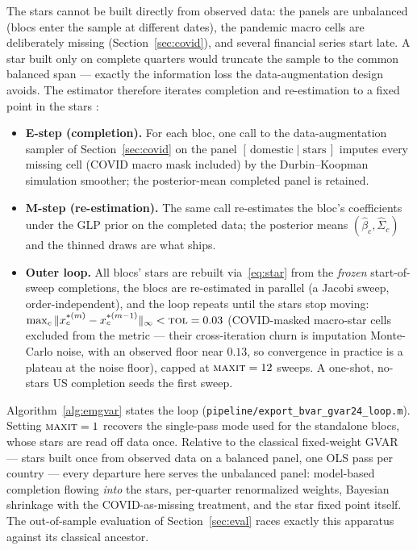 \documentclass[11pt]{article}
\theoremstyle{plain}
\theoremstyle{remark}
\begin{document}
The stars cannot be built directly from observed data: the panels are
unbalanced (blocs enter the sample at different dates), the pandemic
macro cells are deliberately missing (Section~\ref{sec:covid}), and
several financial series start late. A star built only on complete
quarters would truncate the sample to the common balanced span ---
exactly the information loss the data-augmentation design avoids. The
estimator therefore iterates completion and re-estimation to a fixed
point in the stars \citep[in the spirit of][]{DempsterLairdRubin1977}:
\begin{itemize}
  \item \textbf{E-step (completion).} For each bloc, one call to the
    data-augmentation sampler of Section~\ref{sec:covid} on the panel
    $[\,\text{domestic} \mid \text{stars}\,]$ imputes every missing cell
    (COVID macro mask included) by the Durbin--Koopman simulation
    smoother; the posterior-mean completed panel is retained.
  \item \textbf{M-step (re-estimation).} The same call re-estimates the
    bloc's coefficients under the GLP prior on the completed data; the
    posterior means $(\hat\beta_c, \hat\Sigma_c)$ and the thinned draws
    are what ships.
  \item \textbf{Outer loop.} All blocs' stars are rebuilt
    via~\eqref{eq:star} from the \emph{frozen} start-of-sweep
    completions, the blocs are re-estimated in parallel (a Jacobi sweep,
    order-independent), and the loop repeats until the stars stop
    moving:
    $\max_c \|x^{*(m)}_c - x^{*(m-1)}_c\|_\infty < \textsc{tol} = 0.03$
    (COVID-masked macro-star cells excluded from the metric --- their
    cross-iteration churn is imputation Monte-Carlo noise, with an
    observed floor near $0.13$, so convergence in practice is a plateau
    at the noise floor), capped at $\textsc{maxit} = 12$ sweeps. A
    one-shot, no-stars US completion seeds the first sweep.
\end{itemize}
Algorithm~\ref{alg:emgvar} states the loop
(\texttt{pipeline/export\_bvar\_gvar24\_loop.m}). Setting
$\textsc{maxit}=1$ recovers the single-pass mode used for the standalone
blocs, whose stars are read off data once. Relative to the classical
fixed-weight GVAR --- stars built once from observed data on a balanced
panel, one OLS pass per country --- every departure here serves the
unbalanced panel: model-based completion flowing \emph{into} the stars,
per-quarter renormalized weights, Bayesian shrinkage with the
COVID-as-missing treatment, and the star fixed point itself. The
out-of-sample evaluation of Section~\ref{sec:eval} races exactly this
apparatus against its classical ancestor.
\end{document}

